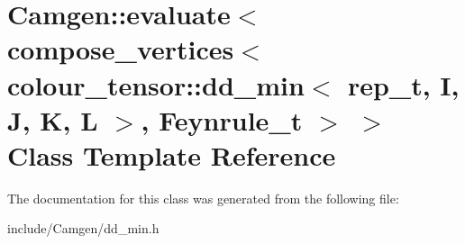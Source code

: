 \hypertarget{a00166}{\section{Camgen\-:\-:evaluate$<$ compose\-\_\-vertices$<$ colour\-\_\-tensor\-:\-:dd\-\_\-min$<$ rep\-\_\-t, I, J, K, L $>$, Feynrule\-\_\-t $>$ $>$ Class Template Reference}
\label{a00166}
}


The documentation for this class was generated from the following file\-:\begin{DoxyCompactItemize}
\item 
include/\-Camgen/dd\-\_\-min.\-h\end{DoxyCompactItemize}
